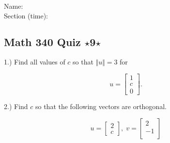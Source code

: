 \documentclass{article}
\begin{document}
Name:\\
\medskip
Section (time):

\subsection*{Math 340 Quiz $\star$9$\star$}


1.) Find all values of $c$ so that $\Vert u \Vert = 3$ for

$$u=\left[\begin{array}{c}
1\\
c\\
0\end{array}
\right].$$

2.) Find $c$ so that the following vectors are orthogonal.


$$u=\left[\begin{array}{c}
2\\
c\end{array}
\right], \;v=\left[\begin{array}{c}
2\\
-1\\\end{array}
\right]$$
\end{document}
